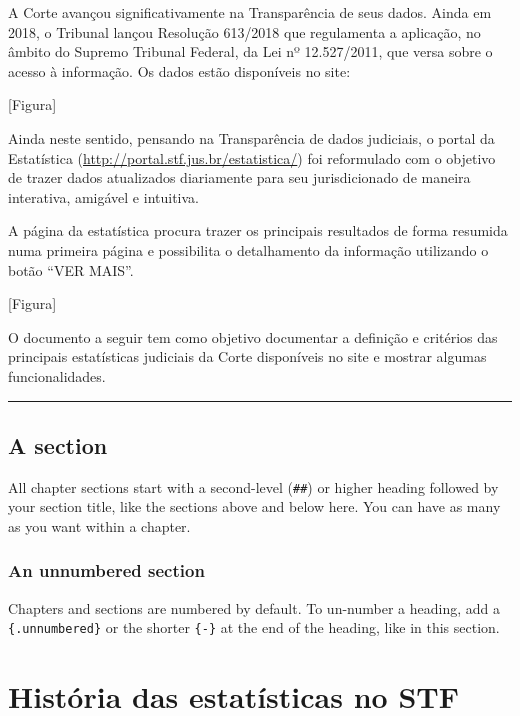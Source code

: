 \documentclass[
]{book}
\begin{document}
A Corte avançou significativamente na Transparência de seus dados. Ainda em 2018, o Tribunal lançou Resolução 613/2018 que regulamenta a aplicação, no âmbito do Supremo Tribunal Federal, da Lei nº 12.527/2011, que versa sobre o acesso à informação. Os dados estão disponíveis no site:

{[}Figura{]}

Ainda neste sentido, pensando na Transparência de dados judiciais, o portal da Estatística (\url{http://portal.stf.jus.br/estatistica/}) foi reformulado com o objetivo de trazer dados atualizados diariamente para seu jurisdicionado de maneira interativa, amigável e intuitiva.

A página da estatística procura trazer os principais resultados de forma resumida numa primeira página e possibilita o detalhamento da informação utilizando o botão ``VER MAIS''.

{[}Figura{]}

O documento a seguir tem como objetivo documentar a definição e critérios das principais estatísticas judiciais da Corte disponíveis no site e mostrar algumas funcionalidades.

\begin{center}\rule{0.5\linewidth}{0.5pt}\end{center}

\hypertarget{a-section}{%
\section{A section}\label{a-section}}

All chapter sections start with a second-level (\texttt{\#\#}) or higher heading followed by your section title, like the sections above and below here. You can have as many as you want within a chapter.

\hypertarget{an-unnumbered-section}{%
\subsection*{An unnumbered section}\label{an-unnumbered-section}}

Chapters and sections are numbered by default. To un-number a heading, add a \texttt{\{.unnumbered\}} or the shorter \texttt{\{-\}} at the end of the heading, like in this section.

\hypertarget{historia}{%
\chapter{História das estatísticas no STF}\label{historia}}
\end{document}
